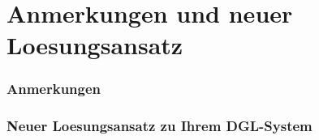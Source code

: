 \documentclass[a4paper,10pt]{scrartcl}
\begin{document}

% 

%
\newpage
\normalsize
\part{Anmerkungen und neuer Loesungsansatz}

\section{Anmerkungen}




\newpage
\section{Neuer Loesungsansatz zu Ihrem DGL-System}

\end{document}
